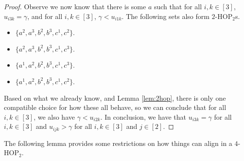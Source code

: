 \documentclass[12pt,oneside,british,a4wide]{amsart}
\numberwithin{equation}{section}
\theoremstyle{definition}
\def\HOP{\mathrm{HOP}}
\begin{document}
\begin{proof}
Observe we now know that there is some $a$ such that for all $i,k\in [3]$, $u_{i3k}=\gamma$, and for all $i,k\in [3]$, $\gamma<u_{i1k}$.  The following sets also form $2$-$\HOP_2$s.
\begin{itemize}
\item $\{a^2,a^3,b^2,b^3,c^1,c^2\}$.
\item   $\{a^2,a^3,b^2,b^3,c^1,c^3\}$. 
\item $\{a^1,a^2,b^2,b^3,c^1,c^3\}$.
\item $\{a^1,a^2,b^2,b^3,c^1,c^2\}$.
\end{itemize}
Based on what we already know, and Lemma \ref{lem:2hop}, there is only one compatible choice for how these all behave, so we can conclude that for all $i,k\in [3]$, we also have $\gamma<u_{i2k}$.  In conclusion, we have that $u_{i3k}=\gamma$ for all $i,k\in [3]$ and $u_{ijk}>\gamma$ for all $i,k\in [3]$ and $j\in [2]$.
\end{proof}

The following lemma provides some restrictions on how things can align in a $4$-$\HOP_2$.
\end{document}
